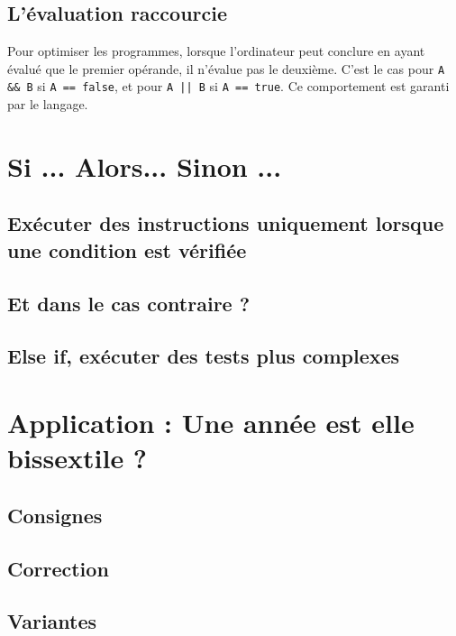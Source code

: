 \subsection{L'évaluation raccourcie}
Pour optimiser les programmes, lorsque l'ordinateur peut conclure en ayant évalué que le premier opérande, il n'évalue pas le deuxième. C'est le cas pour \texttt{A && B} si \texttt{A == false},
et pour \texttt{A || B} si \texttt{A == true}.
Ce comportement est garanti par le langage.
\section{Si ... Alors... Sinon ...}

\subsection{Exécuter des instructions uniquement lorsque une condition est vérifiée}

\subsection{Et dans le cas contraire ?}
\subsection{Else if, exécuter des tests plus complexes}
\section{Application : Une année est elle bissextile ?}
\subsection{Consignes}
\subsection{Correction}
\subsection{Variantes}
